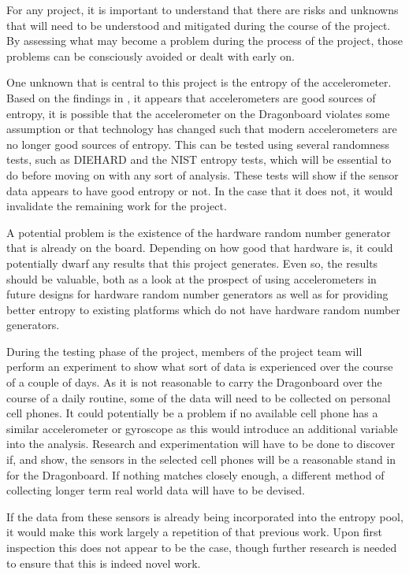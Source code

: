 

For any project, it is important to understand that there are risks and unknowns
that will need to be understood and mitigated during the course of the project.
By assessing what may become a problem during the process of the project, those
problems can be consciously avoided or dealt with early on.

One unknown that is central to this project is the entropy of the accelerometer.
Based on the findings in \cite{voris}, it appears that accelerometers are good
sources of entropy, it is possible that the accelerometer on the Dragonboard
violates some assumption or that technology has changed such that modern
accelerometers are no longer good sources of entropy. This can be tested using
several randomness tests, such as DIEHARD and the NIST entropy tests, which will
be essential to do before moving on with any sort of analysis.  These tests will
show if the sensor data appears to have good entropy or not.  In the case that
it does not, it would invalidate the remaining work for the project. 

A potential problem is the existence of the hardware random number generator
that is already on the board. Depending on how good that hardware is, it could
potentially dwarf any results that this project generates. Even so, the results
should be valuable, both as a look at the prospect of using accelerometers in
future designs for hardware random number generators as well as for providing
better entropy to existing platforms which do not have hardware random number
generators. 

During the testing phase of the project, members of the project team will
perform an experiment to show what sort of data is experienced over the course
of a couple of days. As it is not reasonable to carry the Dragonboard over the
course of a daily routine, some of the data will need to be collected on
personal cell phones. It could potentially be a problem if no available cell
phone has a similar accelerometer or gyroscope as this would introduce an
additional variable into the analysis. Research and experimentation will have to
be done to discover if, and show, the sensors in the selected cell phones will
be a reasonable stand in for the Dragonboard. If nothing matches closely enough,
a different method of collecting longer term real world data will have to be
devised.

If the data from these sensors is already being incorporated into the entropy
pool, it would make this work largely a repetition of that previous work. Upon
first inspection this does not appear to be the case, though further research is
needed to ensure that this is indeed novel work.
